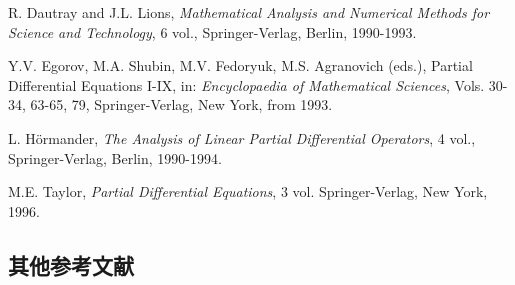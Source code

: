 \begin{list}{}{\setlength{\labelwidth}{3em}\setlength{\leftmargin}{4em}\setlength{\labelsep}{.8em}}
\item[{[DL]}] R. Dautray and J.L. Lions, \emph{Mathematical Analysis and Numerical Methods for Science and Technology}, 6 vol., Springer-Verlag, Berlin, 1990-1993.

\item[{[ESFA]}] Y.V. Egorov, M.A. Shubin, M.V. Fedoryuk, M.S. Agranovich (eds.), Partial Differential Equations I-IX, in: \emph{Encyclopaedia of Mathematical Sciences}, Vols. 30-34, 63-65, 79, Springer-Verlag, New York, from 1993.

\item[{[Hor]}] L. Hörmander, \emph{The Analysis of Linear Partial Differential Operators}, 4 vol., Springer-Verlag, Berlin, 1990-1994.

\item[{[Tay]}] M.E. Taylor, \emph{Partial Differential Equations}, 3 vol. Springer-Verlag, New York, 1996.
\end{list}

\subsection{其他参考文献}\label{sec:references-other-references}

